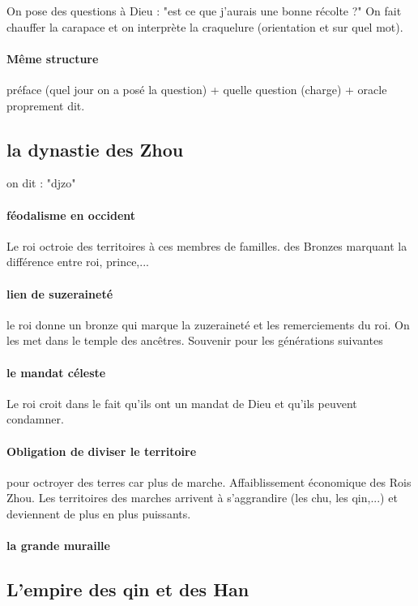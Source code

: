 On pose des questions à Dieu : "est ce que j'aurais une bonne récolte ?"
On fait chauffer la carapace et on interprète la craquelure (orientation et sur quel mot). 
\paragraph{Même structure} préface (quel jour on a posé la question) + quelle question (charge) + oracle proprement dit. 

\subsection{la dynastie des Zhou}
on dit : "djzo"

\paragraph{féodalisme en occident} Le roi octroie des territoires à ces membres de familles.  des Bronzes marquant la différence entre roi, prince,...


\paragraph{lien de suzeraineté} le roi donne un bronze qui marque la zuzeraineté et les remerciements du roi. On les met dans le temple des ancêtres. Souvenir pour les générations suivantes

\paragraph{le mandat céleste} Le roi croit dans le fait qu'ils ont un mandat de Dieu et qu'ils peuvent condamner.

\paragraph{Obligation de diviser le territoire} pour octroyer des terres car plus de marche. Affaiblissement économique des Rois Zhou.
Les territoires des marches arrivent à s'aggrandire (les chu, les qin,...) et deviennent de plus en plus puissants. 

\paragraph{la grande muraille} 

\subsection{L'empire des qin et des Han }
